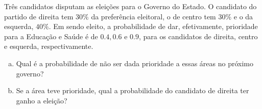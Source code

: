 %
%


\begin{exercicioBanco}[\valorquestao]
Três candidatos disputam as eleições para o Governo do Estado. O candidato do partido de direita tem \(30\%\) da preferência eleitoral, o de centro tem \(30\%\) e o da esquerda, \(40\%\). Em sendo eleito, a probabilidade de dar, efetivamente, prioridade para a Educação e Saúde é de \(0.4, 0.6\) e \(0.9\), para os candidatos de direita, centro e esquerda, respectivamente.
%
\begin{enumerate}[(a)]
    \item Qual é a probabilidade de não ser dada prioridade  a essas áreas no próximo governo?
    \item Se a área teve prioridade, qual a probabilidade do candidato de direita ter ganho a eleição?
\end{enumerate}
%
\end{exercicioBanco}


